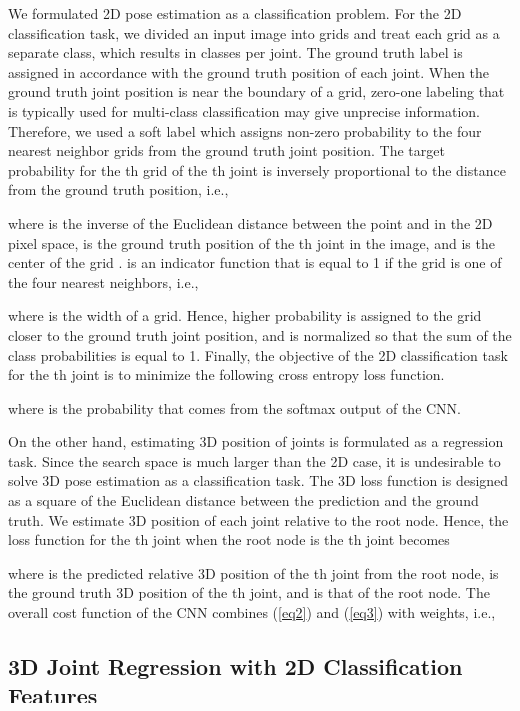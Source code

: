 \documentclass[runningheads]{llncs}
\begin{document}
We formulated 2D pose estimation as a classification problem. For the 2D classification task, we divided an input image into  grids and treat each grid as a separate class, which results in  classes per joint. The ground truth label is assigned in accordance with the ground truth position of each joint. When the ground truth joint position is near the boundary of a grid, zero-one labeling that is typically used for multi-class classification may give unprecise information. Therefore, we used a soft label which assigns non-zero probability to the four nearest neighbor grids from the ground truth joint position. The target probability for the th grid  of the th joint is inversely proportional to the distance from the ground truth position, i.e.,

where  is the inverse of the Euclidean distance between the point  and  in the 2D pixel space,  is the ground truth position of the th joint in the image, and  is the center of the grid .  is an indicator function that is equal to 1 if the grid  is one of the four nearest neighbors, i.e.,

where  is the width of a grid. Hence, higher probability is assigned to the grid closer to the ground truth joint position, and  is normalized so that the sum of the class probabilities is equal to 1. Finally, the objective of the 2D classification task for the th joint is to minimize the following cross entropy loss function.

where  is the probability that comes from the softmax output of the CNN.

On the other hand, estimating 3D position of joints is formulated as a regression task. Since the search space is much larger than the 2D case, it is undesirable to solve 3D pose estimation as a classification task. The 3D loss function is designed as a square of the Euclidean distance between the prediction and the ground truth. We estimate 3D position of each joint relative to the root node. Hence, the loss function for the th joint when the root node is the th joint becomes

where  is the predicted relative 3D position of the th joint from the root node,  is the ground truth 3D position of the th joint, and  is that of the root node. The overall cost function of the CNN combines (\ref{eq2}) and (\ref{eq3}) with weights, i.e.,


\subsection{3D Joint Regression with 2D Classification Features}
\end{document}
